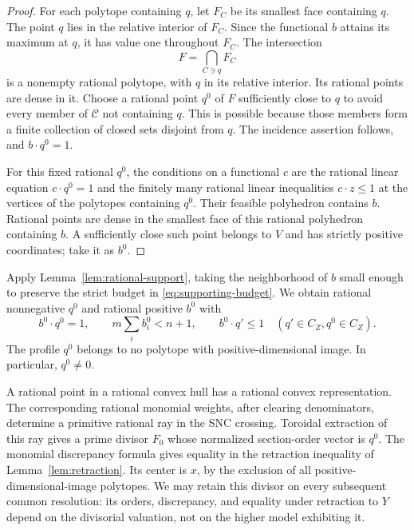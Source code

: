 \begin{proof}
For each polytope containing \(q\), let \(F_C\) be its smallest face
containing \(q\).  The point \(q\) lies in the relative interior of
\(F_C\).  Since the functional \(b\) attains its maximum at \(q\),
it has value one throughout \(F_C\).  The intersection
\[
 F=\bigcap_{C\ni q}F_C
\]
is a nonempty rational polytope, with \(q\) in its relative interior.
Its rational points are dense in it.  Choose a rational point \(q^0\)
of \(F\) sufficiently close to \(q\) to avoid every member of
\(\mathcal C\) not containing \(q\).  This is possible because those
members form a finite collection of closed sets disjoint from \(q\).
The incidence assertion follows, and \(b\cdot q^0=1\).

For this fixed rational \(q^0\), the conditions on a functional \(c\)
are the rational linear equation \(c\cdot q^0=1\) and the finitely
many rational linear inequalities \(c\cdot z\leq1\) at the vertices
of the polytopes containing \(q^0\).  Their feasible polyhedron
contains \(b\).  Rational points are dense in the smallest face of
this rational polyhedron containing \(b\).  A sufficiently close such
point belongs to \(V\) and has strictly positive coordinates; take it
as \(b^0\).
\end{proof}

Apply Lemma~\ref{lem:rational-support}, taking the neighborhood of
\(b\) small enough to preserve the strict budget in
\eqref{eq:supporting-budget}.  We obtain rational nonnegative
\(q^0\) and rational positive \(b^0\) with
\begin{equation}
 b^0\cdot q^0=1,
 \qquad m\sum_i b_i^0<n+1,
 \qquad b^0\cdot q'\leq1
 \quad(q'\in C_Z, q^0\in C_Z).
 \label{eq:rational-support-properties}
\end{equation}
The profile \(q^0\) belongs to no polytope with positive-dimensional
image.  In particular, \(q^0\ne0\).

A rational point in a rational convex hull has a rational convex
representation.  The corresponding rational monomial weights,
after clearing denominators, determine a primitive rational ray in
the SNC crossing.  Toroidal extraction of this ray gives a prime
divisor \(F_0\) whose normalized section-order vector is \(q^0\).
The monomial discrepancy formula gives equality in the retraction
inequality of Lemma~\ref{lem:retraction}.  Its center is \(x\), by
the exclusion of all positive-dimensional-image polytopes.  We may
retain this divisor on every subsequent common resolution: its
orders, discrepancy, and equality under retraction to \(Y\) depend
on the divisorial valuation, not on the higher model exhibiting it.

